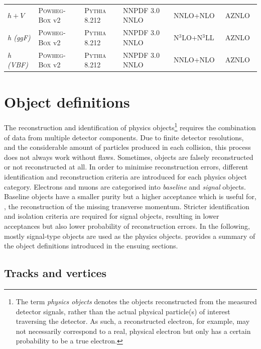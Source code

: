 \begin{table}
{\begin{tabular} {llllll}
	$h+V$ & \textsc{Powheg-Box} v2 & \textsc{Pythia} 8.212 & NNPDF 3.0 NNLO & NNLO+NLO~\cite{deFlorian:2016spz} & AZNLO~\cite{ATL-PHYS-PUB-2013-017} \\
	\textit{h (ggF)} & \textsc{Powheg-Box} v2 & \textsc{Pythia} 8.212 & NNPDF 3.0 NNLO & N$^3$LO+N$^3$LL~\cite{deFlorian:2016spz} & AZNLO \\
	\textit{h (VBF)} & \textsc{Powheg-Box} v2 & \textsc{Pythia} 8.212 & NNPDF 3.0 NNLO & NNLO+NLO~\cite{deFlorian:2016spz} & AZNLO \\
	\bottomrule
	\end{tabular}}\vspace{2mm}
	\label{tab:mc_generators}   
\end{table}

\section{Object definitions}\label{sec:object_definitions}

The reconstruction and identification of physics objects\footnote{The term \textit{physics objects} denotes the objects reconstructed from the measured detector signals, rather than the actual physical particle(s) of interest traversing the detector. As such, a reconstructed electron, for example, may not necessarily correspond to a real, physical electron but only has a certain probability to be a true electron.} requires the combination of data from multiple detector components.
Due to finite detector resolutions, and the considerable amount of particles produced in each collision, this process does not always work without flaws.
Sometimes, objects are falsely reconstructed or not reconstructed at all. In order to minimise reconstruction errors, different identification and reconstruction criteria are introduced for each physics object category. Electrons and muons are categorised into \textit{baseline} and \textit{signal} objects.
Baseline objects have a smaller purity but a higher acceptance which is useful for, \eg, the reconstruction of the missing transverse momentum. Stricter identification and isolation criteria are required for signal objects, resulting in lower acceptances but also lower probability of reconstruction errors.
In the following, mostly signal-type objects are used as the physics objects.  provides a summary of the object definitions introduced in the ensuing sections.

\subsection{Tracks and vertices}\label{sec:reco_tracks}

